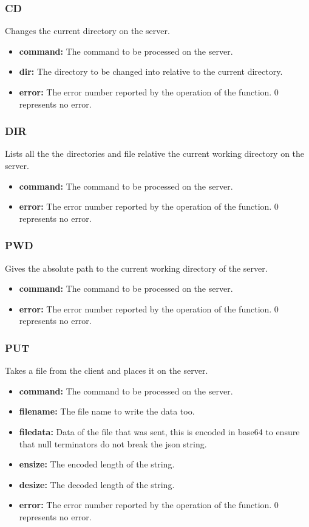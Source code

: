 \documentclass{article}
\begin{document}
\subsubsection{CD}
Changes the current directory on the server.
\begin{itemize}
\item \textbf{command:} The command to be processed on the server.
\item \textbf{dir:} The directory to be changed into relative to the current directory. 
\item \textbf{error:} The error number reported by the operation of the function. 0 represents no error.   
\end{itemize}
\subsubsection{DIR}
Lists all the the directories and file relative the current working directory on the server.
\begin{itemize}
\item \textbf{command:} The command to be processed on the server.
\item \textbf{error:} The error number reported by the operation of the function. 0 represents no error.
\end{itemize}
\subsubsection{PWD}
Gives the absolute path to the current working directory of the server.
\begin{itemize}
\item \textbf{command:} The command to be processed on the server.
\item \textbf{error:} The error number reported by the operation of the function. 0 represents no error.
\end{itemize}
\subsubsection{PUT}
Takes a file from the client and places it on the server.
\begin{itemize}
\item \textbf{command:} The command to be processed on the server.
\item \textbf{filename:} The file name to write the data too.
\item \textbf{filedata:} Data of the file that was sent, this is encoded in base64 to ensure that null terminators do not break the json string.
\item \textbf{ensize:} The encoded length of the string.
\item \textbf{desize:} The decoded length of the string.
\item \textbf{error:} The error number reported by the operation of the function. 0 represents no error.
\end{itemize}
\end{document}
